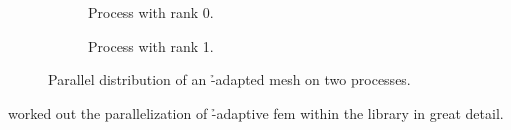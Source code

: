 \begin{figure}
\begin{subfigure}[t]{.35\textwidth}
  \centering
  
  \caption{Process with rank 0.}
\end{subfigure}
\begin{subfigure}[t]{.35\textwidth}
  \centering
  
  \caption{Process with rank 1.}
\end{subfigure}
\begin{subfigure}[t]{.28\textwidth}
  \centering
  
\end{subfigure}
\caption{Parallel distribution of an \h-adapted mesh on two processes.}
\label{fig:paralleldistribution}
\end{figure}




\textcite{bangerth2012} worked out the parallelization of \h-adaptive \gls{fem} within the \dealii{} library in great detail.